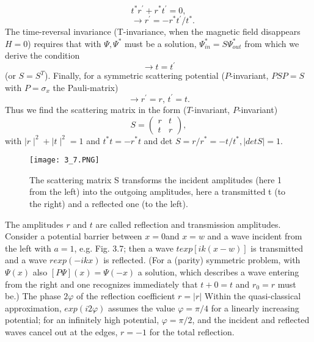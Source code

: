 \begin{equation}
    t^* r^{\prime}+r^*t^{\prime}=0,
\end{equation}
\begin{equation}
    \quad \to r^{\prime}=-r^*t^{\prime}/t^*.
\end{equation}
The time-reversal invariance (T-invariance, when the magnetic field disappears $H = 0$) requires that with $\Psi, \Psi^*$ must be a solution,
$\Psi^*_{in} = S\Psi^*_{out}$ from which we derive the condition
\begin{equation}
    \to t=t^{\prime}  
\end{equation}
(or $S = S^T$). Finally, for a symmetric scattering potential ($P$-invariant, $PSP = S$ with $P = \sigma_x$ the Pauli-matrix)
\begin{equation}
    \to r^{\prime}=r,\, t^{\prime}=t.
\end{equation}
Thus we find the scattering matrix in the form ($T$-invariant, $P$-invariant)
\begin{equation}
    S = \left(\begin{array}{cc}{r}&{t}\\{t}&{r}
    \end{array}\right),
\end{equation}
with $\mid r\mid ^2 + \mid t\mid^2=1$ and $t^*t=-r^*t$ and det $S=r/r^*=-t/t^*,\mid det S\mid = 1$.
\begin{figure}[ht]
    \begin{minipage}{0.5\textwidth}
        \centering
        \texttt{[image: 3\_7.PNG]}
    \end{minipage}
    \begin{minipage}{0.5\textwidth}
        \caption{The scattering matrix S transforms the incident amplitudes (here 1 from the left) into the outgoing amplitudes, here a transmitted t (to the right) and a reflected one (to the left).}
    \end{minipage}
\end{figure}
The amplitudes $r$ and $t$ are called reflection and transmission amplitudes. Consider a potential barrier between $x = 0 $and $x = w$ and a wave incident from the left with $a = 1$, e.g. Fig. 3.7; then a wave $t exp [ik (x - w)]$ is transmitted and a wave $r exp (-ikx)$ is reflected. (For a (parity) symmetric problem, with $\Psi(x)$ also $[P\Psi] (x ) = \Psi (-x)$ a solution, which describes a wave entering from the right and one recognizes immediately that $t+0 = t$ and $r_0 = r$ must be.) The phase $2φ$ of the reflection coefficient $r = | r |$ Within the quasi-classical approximation, $exp (i2φ)$ assumes the value $φ = \pi / 4$ for a linearly increasing potential; for an infinitely high potential, $φ = \pi / 2$, and the incident and reflected waves cancel out at the edges, $r = -1$ for the total reflection.\\
